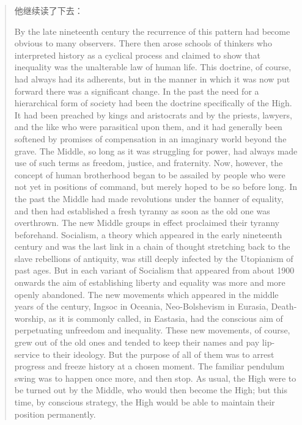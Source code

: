\begin{paracol}{2}
\begin{quotation}
\switchcolumn

他继续读了下去：

\switchcolumn*

By the late nineteenth century the recurrence of this pattern had become
obvious to many observers. There then arose schools of thinkers who
interpreted history as a cyclical process and claimed to show that
inequality was the unalterable law of human life. This doctrine, of
course, had always had its adherents, but in the manner in which it was
now put forward there was a significant change. In the past the need for
a hierarchical form of society had been the doctrine specifically of the
High. It had been preached by kings and aristocrats and by the priests,
lawyers, and the like who were parasitical upon them, and it had
generally been softened by promises of compensation in an imaginary
world beyond the grave. The Middle, so long as it was struggling for
power, had always made use of such terms as freedom, justice, and
fraternity. Now, however, the concept of human brotherhood began to be
assailed by people who were not yet in positions of command, but merely
hoped to be so before long. In the past the Middle had made revolutions
under the banner of equality, and then had established a fresh tyranny
as soon as the old one was overthrown. The new Middle groups in effect
proclaimed their tyranny beforehand. Socialism, a theory which appeared
in the early nineteenth century and was the last link in a chain of
thought stretching back to the slave rebellions of antiquity, was still
deeply infected by the Utopianism of past ages. But in each variant of
Socialism that appeared from about 1900 onwards the aim of establishing
liberty and equality was more and more openly abandoned. The new
movements which appeared in the middle years of the century, Ingsoc in
Oceania, Neo-Bolshevism in Eurasia, Death-worship, as it is commonly
called, in Eastasia, had the conscious aim of perpetuating unfreedom and
inequality. These new movements, of course, grew out of the old ones and
tended to keep their names and pay lip-service to their ideology. But
the purpose of all of them was to arrest progress and freeze history at
a chosen moment. The familiar pendulum swing was to happen once more,
and then stop. As usual, the High were to be turned out by the Middle,
who would then become the High; but this time, by conscious strategy,
the High would be able to maintain their position permanently.

\switchcolumn


\end{quotation}
\end{paracol}
